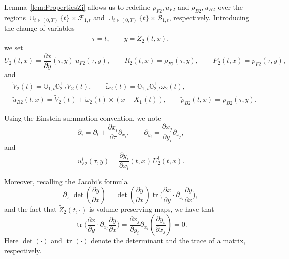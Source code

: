 \documentclass[11pt,twoside,reqno]{amsart}
\numberwithin{equation}{section}
\numberwithin{figure}{section}
\begin{document}
Lemma~\ref{lem:PropertiesZi} allows us to redefine $\rho_{F2},u_{F2}$ and $\rho_{B2},u_{B2}$ over the regions $\cup_{t\in(0,T)}\{t\}\times\mathcal{F}_{1,t}$ and $\cup_{t\in(0,T)}\{t\}\times\mathcal{B}_{1,t}$, respectively.  
Introducing the change of variables
\begin{equation}
\tau=t,\qquad y=\tilde{Z}_2(t,x),
\end{equation}
we set
\begin{equation}\label{eq:TransformFluidp}
U_2(t,x)=\frac{\partial x}{\partial y}(\tau,y)\,u_{F2}(\tau,y),\qquad
R_2(t,x)=\rho_{F2}(\tau,y),\qquad
P_2(t,x)=p_{F2}(\tau,y),
\end{equation}
and
\begin{equation}\label{eq:TransformedVelocity}
\begin{aligned}
&\tilde{V}_2(t)=\mathbb{O}_{1,t}\mathbb{O}_{2,t}^\top V_2(t), \qquad 
\tilde{\omega}_2(t)=\mathbb{O}_{1,t}\mathbb{O}_{2,t}^\top \omega_2(t),\\
&\tilde{u}_{B2}(t,x)=\tilde{V}_2(t)+\tilde{\omega}_2(t)\times(x-X_1(t)),\qquad
\tilde{\rho}_{B2}(t,x)=\rho_{B2}(\tau,y).
\end{aligned}
\end{equation}

Using the Einstein summation convention, we note
\[
\partial_\tau=\partial_t+\frac{\partial x_i}{\partial \tau}\partial_{x_i},\qquad
\partial_{y_i}=\frac{\partial x_j}{\partial y_i}\partial_{x_j},
\]
and
\[
u_{F2}^i(\tau,y)=\frac{\partial y_i}{\partial x_l}(t,x)\,U_2^l(t,x).
\]

Moreover, recalling the Jacobi's formula $$\partial_{x_l}\operatorname{det}(\frac{\partial y}{\partial x})=\operatorname{det}(\frac{\partial y}{\partial x})\operatorname{tr}\Big(\frac{\partial x}{\partial y}\cdot\partial_{x_l}\frac{\partial y}{\partial x}\Big),$$ 
and the fact that $ \tilde{Z}_2(t,\cdot)$ is volume-preserving maps,  we have that 
$$\operatorname{tr}\Big(\frac{\partial x}{\partial y}\cdot\partial_{x_l}\frac{\partial y}{\partial x}\Big)=\frac{\partial x_j}{\partial y_i}\partial_{x_l}(\frac{\partial y_i}{\partial x_j})=0.$$
Here $\operatorname{det}(\cdot)$ and $\operatorname{tr}(\cdot)$ denote the determinant and the trace of a matrix, respectively.
\end{document}
